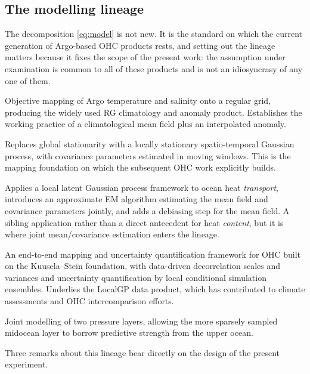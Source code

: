 \documentclass[11pt]{article}
\begin{document}
\subsection{The modelling lineage}
\label{sec:lineage}

The decomposition \eqref{eq:model} is not new. It is the standard on which the current
generation of Argo-based OHC products rests, and setting out the lineage matters because it
fixes the scope of the present work: the assumption under examination is common to all of these
products and is not an idiosyncrasy of any one of them.

\begin{description}[leftmargin=*,style=nextline]
  \item[Roemmich \& Gilson (2009).] Objective mapping of Argo temperature and salinity onto a
    regular grid, producing the widely used RG climatology and anomaly product. Establishes the
    working practice of a climatological mean field plus an interpolated anomaly.
  \item[Kuusela \& Stein (2018).] Replaces global stationarity with a locally stationary
    spatio-temporal Gaussian process, with covariance parameters estimated in moving windows.
    This is the mapping foundation on which the subsequent OHC work explicitly builds.
  \item[Park, Kuusela, Giglio \& Gray (2023).] Applies a local latent Gaussian process
    framework to ocean heat \emph{transport}, introduces an approximate EM algorithm estimating
    the mean field and covariance parameters jointly, and adds a debiasing step for the mean
    field. A sibling application rather than a direct antecedent for heat \emph{content}, but it
    is where joint mean/covariance estimation enters the lineage.
  \item[Sukianto et al.\ (2026).] An end-to-end mapping and uncertainty quantification framework
    for OHC built on the Kuusela--Stein foundation, with data-driven decorrelation scales and
    variances and uncertainty quantification by local conditional simulation ensembles.
    Underlies the LocalGP data product, which has contributed to climate assessments and OHC
    intercomparison efforts.
  \item[Bivariate extension (2026).] Joint modelling of two pressure layers, allowing the more
    sparsely sampled midocean layer to borrow predictive strength from the upper ocean.
\end{description}

Three remarks about this lineage bear directly on the design of the present experiment.
\end{document}
